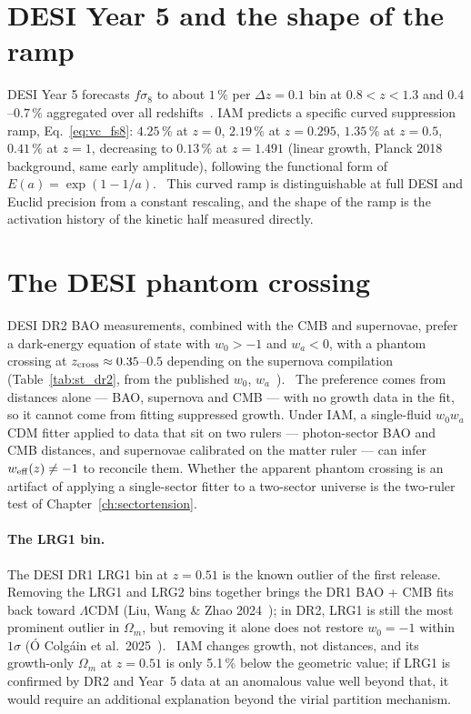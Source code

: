 \section{DESI Year 5 and the shape of the ramp}\label{sec:vt_desi}
DESI Year 5 forecasts $f\sigma_8$ to about $1\,\%$ per $\Delta z=0.1$ bin at $0.8<z<1.3$ and $0.4$--$0.7\,\%$ aggregated over all redshifts~\cite{DESI2016}.
IAM predicts a specific curved suppression ramp, Eq.~\eqref{eq:vc_fs8}: $4.25\,\%$ at $z=0$, $2.19\,\%$ at $z=0.295$, $1.35\,\%$ at $z=0.5$, $0.41\,\%$ at $z=1$,
decreasing to $0.13\,\%$ at $z=1.491$ (linear growth, Planck 2018 background, same early amplitude), following the functional form of $E(a)=\exp(1-1/a)$.
\prediction\ This curved ramp is distinguishable at full DESI and Euclid precision from a constant rescaling, and the shape of the ramp is the activation
history of the kinetic half measured directly.

\section{The DESI phantom crossing}\label{sec:vt_phantom}
DESI DR2 BAO measurements, combined with the CMB and supernovae, prefer a dark-energy equation of state with $w_0>-1$ and $w_a<0$, with a phantom crossing at
$z_{\rm cross}\approx0.35$--$0.5$ depending on the supernova compilation (Table~\ref{tab:st_dr2}, from the published $w_0$, $w_a$~\cite{DESI2025}). \observed\ The preference comes from distances alone --- BAO,
supernova and CMB --- with no growth data in the fit, so it cannot come from fitting suppressed growth. Under IAM, a single-fluid $w_0w_a$CDM fitter applied to
data that sit on two rulers --- photon-sector BAO and CMB distances, and supernovae calibrated on the matter ruler --- can infer $w_{\rm eff}(z)\neq-1$ to
reconcile them. Whether the apparent phantom crossing is an artifact of applying a single-sector fitter to a two-sector universe is the two-ruler test of
Chapter~\ref{ch:sectortension}. \openprob

\paragraph{The LRG1 bin.} The DESI DR1 LRG1 bin at $z=0.51$ is the known outlier of the first release. Removing the LRG1 and LRG2 bins together
brings the DR1 BAO + CMB fits back toward $\Lambda$CDM (Liu, Wang \& Zhao 2024~\cite{Liu2024LRG}); in DR2, LRG1 is still the most prominent outlier in
$\Omega_m$, but removing it alone does not restore $w_0=-1$ within $1\sigma$ (\'O Colg\'ain et al.\ 2025~\cite{Colgain2025}). \observed\ IAM changes growth, not distances, and its growth-only $\Omega_m$ at
$z=0.51$ is only 5.1\,\% below the geometric value; if LRG1 is confirmed by DR2 and Year~5 data at an anomalous value well beyond that, it would require an
additional explanation beyond the virial partition mechanism. \openprob

